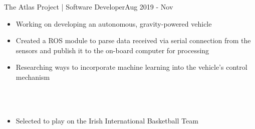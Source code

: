 
\begin{projects}

    \extracurricular
    {The Atlas Project | Software Developer}{Aug 2019 - Nov} 
    {
	    \begin{itemize}
    	    \item Working on developing an autonomous, gravity-powered vehicle 
    	    \item Created a ROS module to parse data received via serial connection from the sensors and publish it to the on-board computer for processing 
    	    \item Researching ways to incorporate machine learning into the vehicle's control mechanism
		\end{itemize}
    }
    \\
    
    \\
    
    {
    \begin{itemize}
        \item Selected to play on the Irish International Basketball Team 
    \end{itemize}
    }

\end{projects}